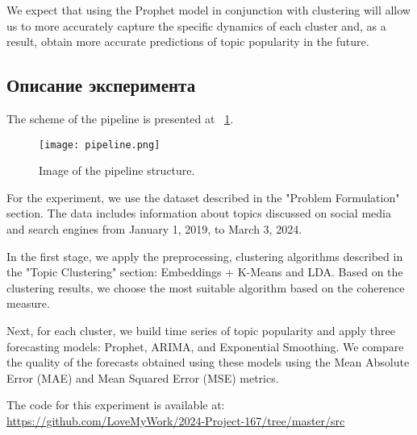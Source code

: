 



We expect that using the Prophet model in conjunction with clustering will allow us to more accurately capture the specific dynamics of each cluster and, as a result, obtain more accurate predictions of topic popularity in the future.

\subsection{Описание эксперимента}
The scheme of the pipeline is presented at ~\ref{fig:pipeline}.

\begin{figure}[h] 
    \centering
    \texttt{[image: pipeline.png]}
    \label{fig:pipeline}
    \caption{Image of the pipeline structure.}
\end{figure}

For the experiment, we use the dataset described in the "Problem Formulation" section. The data includes information about topics discussed on social media and search engines from January 1, 2019, to March 3, 2024.


In the first stage, we apply the preprocessing, clustering algorithms described in the "Topic Clustering" section: Embeddings + K-Means and LDA. Based on the clustering results, we choose the most suitable algorithm based on the coherence measure.

Next, for each cluster, we build time series of topic popularity and apply three forecasting models: Prophet, ARIMA, and Exponential Smoothing. We compare the quality of the forecasts obtained using these models using the Mean Absolute Error (MAE) and Mean Squared Error (MSE) metrics.

The code for this experiment is available at: \url{https://github.com/LoveMyWork/2024-Project-167/tree/master/src}

